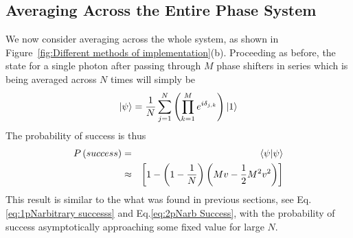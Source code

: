 \documentclass[aps,pra,twocolumn,superscriptaddress,numerical,floatfix]{revtex4-1}
\begin{document}
\subsection{Averaging Across the Entire Phase System\label{Averaging Across the Entire Phase System}}

We now consider averaging across the whole system, as shown in Figure~\ref{fig:Different methods of implementation}(b). Proceeding as before, the state for a single photon after passing through $M$ phase shifters in series which is being averaged across $N$ times will simply be
\begin{equation}
	\ket{\psi}=\frac{1}{N}\sum_{j=1}^{N}\left(\prod_{k=1}^{M}e^{i\delta_{j,k}}\right)\ket{1} \label{eq:AvEndPhaseState}
\end{equation}
The probability of success is thus
\begin{eqnarray}
	P\left(success\right) & = & \braket{\psi|\psi} \nonumber \\
& \approx & \left[1-\left(1-\frac{1}{N}\right)\left(Mv-\frac{1}{2}M^{2}v^{2}\right)\right]\label{eq:AveEndProbSuccess}
\end{eqnarray}
This result is similar to the what was found in previous sections, see Eq.\ref{eq:1pNarbitrary successs} and Eq.\ref{eq:2pNarb Success}, with the probability of success asymptotically approaching some fixed value for large $N$.
\end{document}
